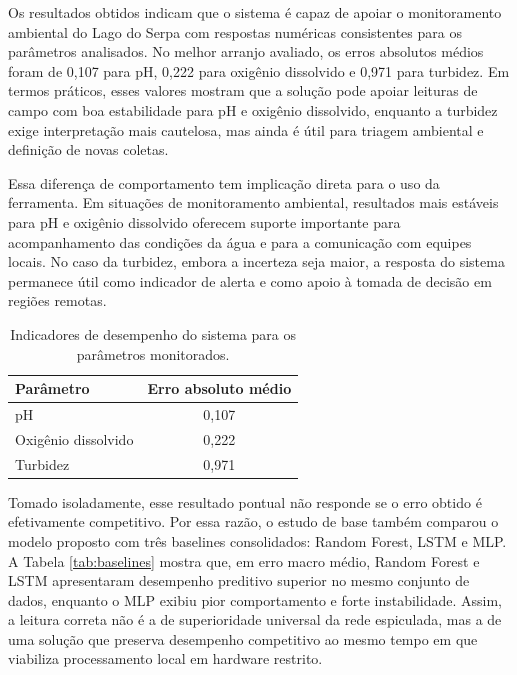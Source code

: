 
Os resultados obtidos indicam que o sistema \'e capaz de apoiar o monitoramento ambiental do Lago do Serpa com respostas num\'ericas consistentes para os par\^ametros analisados. No melhor arranjo avaliado, os erros absolutos m\'edios foram de 0,107 para pH, 0,222 para oxig\^enio dissolvido e 0,971 para turbidez. Em termos pr\'aticos, esses valores mostram que a solu\c{c}\~ao pode apoiar leituras de campo com boa estabilidade para pH e oxig\^enio dissolvido, enquanto a turbidez exige interpreta\c{c}\~ao mais cautelosa, mas ainda \'e \'util para triagem ambiental e defini\c{c}\~ao de novas coletas.

Essa diferen\c{c}a de comportamento tem implica\c{c}\~ao direta para o uso da ferramenta. Em situa\c{c}\~oes de monitoramento ambiental, resultados mais est\'aveis para pH e oxig\^enio dissolvido oferecem suporte importante para acompanhamento das condi\c{c}\~oes da \'agua e para a comunica\c{c}\~ao com equipes locais. No caso da turbidez, embora a incerteza seja maior, a resposta do sistema permanece \'util como indicador de alerta e como apoio \`a tomada de decis\~ao em regi\~oes remotas.

\begin{table}[H]
\centering
\caption{Indicadores de desempenho do sistema para os par\^ametros monitorados.}
\label{tab:desempenho}
\tabelafonte
\begin{tabular}{lc}
\toprule
Par\^ametro & Erro absoluto m\'edio \\
\midrule
pH & 0,107 \\
Oxig\^enio dissolvido & 0,222 \\
Turbidez & 0,971 \\
\bottomrule
\end{tabular}
\end{table}

Tomado isoladamente, esse resultado pontual n\~ao responde se o erro obtido \'e efetivamente competitivo. Por essa raz\~ao, o estudo de base tamb\'em comparou o modelo proposto com tr\^es baselines consolidados: Random Forest, LSTM e MLP. A Tabela \ref{tab:baselines} mostra que, em erro macro m\'edio, Random Forest e LSTM apresentaram desempenho preditivo superior no mesmo conjunto de dados, enquanto o MLP exibiu pior comportamento e forte instabilidade. Assim, a leitura correta n\~ao \'e a de superioridade universal da rede espiculada, mas a de uma solu\c{c}\~ao que preserva desempenho competitivo ao mesmo tempo em que viabiliza processamento local em hardware restrito.

